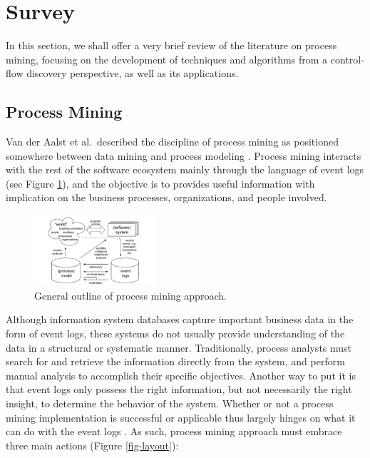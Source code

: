 \documentclass[conference]{IEEEtran}
\begin{document}
\section{Survey}
\label{section-survey}

In this section, we shall offer a very brief review of the literature
on process mining, focusing on the development of techniques
and algorithms from a control-flow discovery perspective, as well as
 its applications.

\subsection{Process Mining}

Van der Aalst et al.~described the discipline of process mining as positioned
somewhere between data mining and process modeling
\cite{van2004}. Process mining interacts with the rest of the software
ecosystem
mainly through the language of event logs (see Figure \ref{fig-outline}),
and the objective is to provides useful information
with implication on the business processes, organizations, and people involved.

\begin{figure}[htbp]
\centerline{\includegraphics[width=0.4\textwidth]{images/image2a.png}}
\caption{General outline of process mining approach.}
\label{fig-outline}
\end{figure}

Although information system databases capture important business data
in the form of event logs, these systems do not
usually provide understanding of the data in a structural or systematic manner.
Traditionally, process analysts must search for and
retrieve the information directly from the system, and perform manual
analysis to accomplish their specific objectives.
Another way to put it is that event logs only possess
the right information, but not necessarily the right insight, to determine the
behavior of the system.
Whether or not a process mining implementation is successful or
applicable thus largely hinges on what it can do with the event logs
\cite{van2012}. As such, process mining approach must
embrace three main actions (Figure \ref{fig-layout}):
\end{document}
